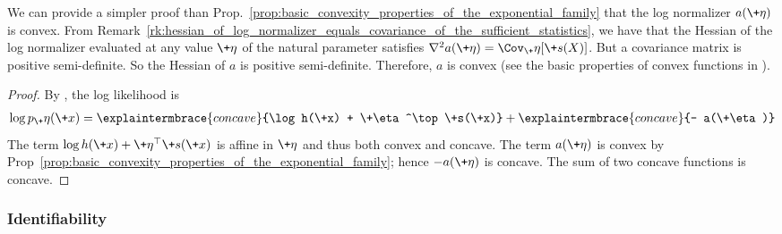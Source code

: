 \documentclass{article} %
\newcommand{\obs}{\+x}
\newcommand{\logNormalizerFunction}{a}
\newcommand{\sufficientStatsFunction}{\+s}
\newcommand{\carrierDensity}{h}
\newcommand{\naturalParam}{\+\eta}
\begin{document}
\begin{remark}
We can provide a simpler proof than Prop.~\ref{prop:basic_convexity_properties_of_the_exponential_family} that the log normalizer $\logNormalizerFunction(\naturalParam)$ is convex.  From Remark~\ref{rk:hessian_of_log_normalizer_equals_covariance_of_the_sufficient_statistics}, we have that the Hessian of the log normalizer evaluated at any value $\naturalParam$ of the natural parameter  satisfies $\nabla^2 \logNormalizerFunction(\naturalParam) = \Cov_\naturalParam[\sufficientStatsFunction(X)]$. But a covariance matrix is positive semi-definite.  So the Hessian of $\logNormalizerFunction$ is positive semi-definite.  Therefore, $\logNormalizerFunction$  is convex (see the basic properties of convex functions in  \citet{grasmair2016basic}).
	
\end{remark}


\begin{proposition}
\label{prop:log_likelihod_of_exponential_family_is_concave}
\end{proposition}

\begin{proof}
By , the log likelihood is 
%
\begin{align*}
\log p_\naturalParam(\obs) =  \explaintermbrace{concave}{\log \carrierDensity(\obs) + \naturalParam^\top \sufficientStatsFunction(\obs)} + \explaintermbrace{concave}{- \logNormalizerFunction(\naturalParam)}	 
\end{align*}
%  
The term $ \log \carrierDensity(\obs)+ \naturalParam^\top \sufficientStatsFunction(\obs) $ is affine in $\naturalParam$ and thus both convex and concave. The term $\logNormalizerFunction(\naturalParam)$ is convex by Prop~\ref{prop:basic_convexity_properties_of_the_exponential_family}; hence $-\logNormalizerFunction(\naturalParam)$ is concave. The sum of two concave functions is concave.	
\end{proof}
 


\subsubsection{Identifiability}
\end{document}
